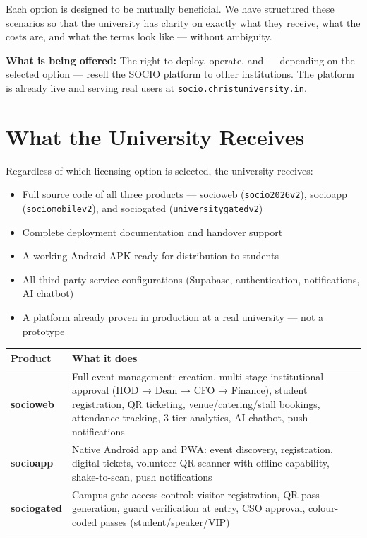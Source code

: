 \documentclass[12pt,a4paper]{article}
\begin{document}
Each option is designed to be mutually beneficial. We have structured these scenarios so that the university has clarity on exactly what they receive, what the costs are, and what the terms look like — without ambiguity.

\begin{infobox}
\textbf{What is being offered:} The right to deploy, operate, and — depending on the selected option — resell the SOCIO platform to other institutions. The platform is already live and serving real users at \texttt{socio.christuniversity.in}.
\end{infobox}

\section{What the University Receives}

Regardless of which licensing option is selected, the university receives:

\begin{itemize}[leftmargin=*]
    \item Full source code of all three products — socioweb (\texttt{socio2026v2}), socioapp (\texttt{sociomobilev2}), and sociogated (\texttt{universitygatedv2})
    \item Complete deployment documentation and handover support
    \item A working Android APK ready for distribution to students
    \item All third-party service configurations (Supabase, authentication, notifications, AI chatbot)
    \item A platform already proven in production at a real university — not a prototype
\end{itemize}

\vspace{0.4cm}

\begin{tabularx}{\textwidth}{L{3.5cm} X}
\toprule
{}
\textbf{Product} & \textbf{What it does} \\
\midrule
\textbf{socioweb} & Full event management: creation, multi-stage institutional approval (HOD → Dean → CFO → Finance), student registration, QR ticketing, venue/catering/stall bookings, attendance tracking, 3-tier analytics, AI chatbot, push notifications \\
\addlinespace
\textbf{socioapp} & Native Android app and PWA: event discovery, registration, digital tickets, volunteer QR scanner with offline capability, shake-to-scan, push notifications \\
\addlinespace
\textbf{sociogated} & Campus gate access control: visitor registration, QR pass generation, guard verification at entry, CSO approval, colour-coded passes (student/speaker/VIP) \\
\bottomrule
\end{tabularx}
\end{document}
